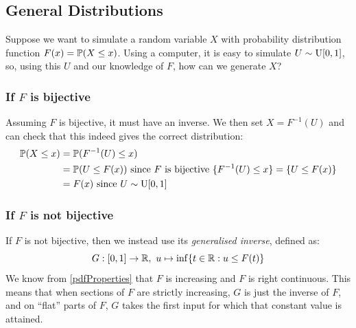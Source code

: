 \documentclass[../main.tex]{subfiles}
\begin{document}
\subsection{General Distributions} \label{simulateGeneral}
Suppose we want to simulate a random variable $X$ with probability distribution function $F(x) = \P(X \leq x)$.
Using a computer, it is easy to simulate $U \sim \uniform[0, 1]$, so, using this $U$ and our knowledge of $F$, how can we generate $X$?
\subsubsection{If $F$ is bijective}
Assuming $F$ is bijective, it must have an inverse.
We then set $X = F^{-1}(U)$ and can check that this indeed gives the correct distribution:
\begin{align*}
  \P(X \leq x) &= \P(F^{-1}(U) \leq x) \\
               &= \P(U \leq F(x)) \text{ since $F$ is bijective } \{F^{-1}(U) \leq x\} = \{U \leq F(x)\} \\
               &= F(x) \text{ since $U \sim \uniform[0, 1]$}
\end{align*}
\subsubsection{If $F$ is not bijective}
If $F$ is not bijective, then we instead use its \textit{generalised inverse}, defined as:
\[
  G: [0, 1] \to \R,\ u \mapsto \inf \{t \in \R: u \leq F(t)\}
\]
We know from \cref{pdfProperties} that $F$ is increasing and $F$ is right continuous.
This means that when sections of $F$ are strictly increasing, $G$ is just the inverse of $F$, and on ``flat'' parts of $F$, $G$ takes the first input for which that constant value is attained.
\end{document}
